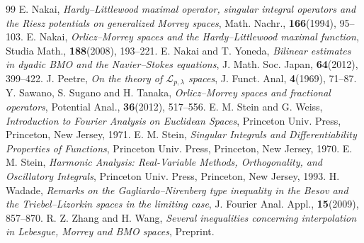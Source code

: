 \documentclass{birkjour}
\theoremstyle{definition}
\theoremstyle{remark}
\numberwithin{equation}{section}
\begin{document}
\begin{thebibliography}{99}
E. Nakai, \textit{Hardy--Littlewood maximal operator, singular integral operators and the Riesz potentials on generalized Morrey spaces}, Math. Nachr., \textbf{166}(1994), 95--103.
E. Nakai, \textit{Orlicz--Morrey spaces and the Hardy--Littlewood maximal function}, Studia Math., \textbf{188}(2008), 193--221.
E. Nakai and T. Yoneda, \textit{Bilinear estimates in dyadic BMO and the Navier--Stokes equations}, J. Math. Soc. Japan, \textbf{64}(2012), 399--422.
J. Peetre, \textit{On the theory of $\mathcal L_{p,\lambda}$ spaces}, J. Funct. Anal, \textbf{4}(1969), 71--87.
Y. Sawano, S. Sugano and H. Tanaka, \textit{Orlicz--Morrey spaces and fractional operators}, Potential Anal., \textbf{36}(2012), 517--556.
E. M. Stein and G. Weiss, \textit{Introduction to Fourier Analysis on Euclidean Spaces}, Princeton Univ. Press, Princeton, New Jersey, 1971.
E. M. Stein, \textit{Singular Integrals and Differentiability Properties of Functions}, Princeton Univ. Press, Princeton, New Jersey, 1970.
E. M. Stein, \textit{Harmonic Analysis: Real-Variable Methods, Orthogonality, and Oscillatory Integrals}, Princeton Univ. Press, Princeton, New Jersey, 1993.
H. Wadade, \textit{Remarks on the Gagliardo--Nirenberg type inequality in the Besov and the Triebel--Lizorkin spaces in the limiting case}, J. Fourier Anal. Appl., \textbf{15}(2009), 857--870.
R. Z. Zhang and H. Wang, \textit{Several inequalities concerning interpolation in Lebesgue, Morrey and BMO spaces}, Preprint.

\end{thebibliography}
\end{document}
